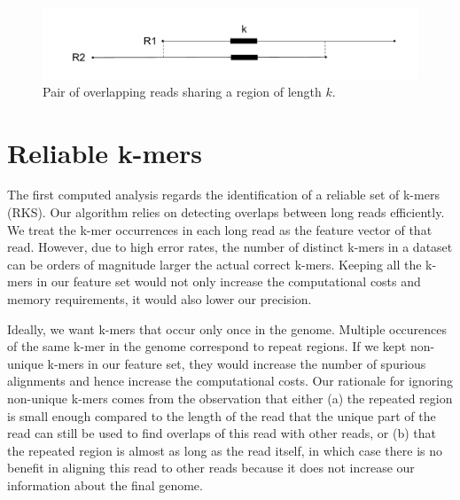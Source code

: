 \documentclass[11pt]{article}
\begin{document}
\begin{figure}
    \centering
    \includegraphics[width=\textwidth]{image/overview.pdf}
    \caption{Pair of overlapping reads sharing a region of length $k$.}
    \label{fig:overview}
\end{figure}

\section{Reliable k-mers}\label{rks}

The first computed analysis regards the identification of a reliable set of k-mers (RKS). 
Our algorithm relies on detecting overlaps between long reads efficiently.
We treat the k-mer occurrences in each long read as the feature vector of that read. 
However, due to high error rates, the number of distinct k-mers in a dataset can be orders of magnitude larger the actual correct k-mers. 
Keeping all the k-mers in our feature set would not only increase the computational costs and memory requirements, it would also lower our precision.

Ideally, we want k-mers that occur only once in the genome. 
Multiple occurences of the same k-mer in the genome correspond to repeat regions. 
If we kept non-unique k-mers in our feature set, they would increase the number of spurious alignments and hence increase the computational costs. 
Our rationale for ignoring non-unique k-mers comes from the observation that either (a) the repeated region is small enough compared to the length of the read that the unique part of the read can still be used to find overlaps of this read with other reads, or (b) that the repeated region is almost as long as the read itself, in which case there is no benefit in aligning this read to other reads because it does not increase our information about the final genome. 
\end{document}
